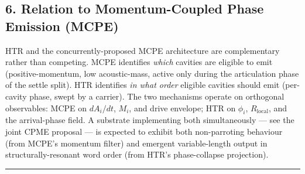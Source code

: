 \documentclass[
  11pt,
  a4paper,
]{article}
\begin{document}
\subsection{6. Relation to Momentum-Coupled Phase Emission
(MCPE)}\label{relation-to-momentum-coupled-phase-emission-mcpe}

HTR and the concurrently-proposed MCPE architecture are complementary
rather than competing. MCPE identifies \emph{which} cavities are
eligible to emit (positive-momentum, low acoustic-mass, active only
during the articulation phase of the settle split). HTR identifies
\emph{in what order} eligible cavities should emit (per-cavity phase,
swept by a carrier). The two mechanisms operate on orthogonal
observables: MCPE on \(dA_i/dt\), \(M_i\), and drive envelope; HTR on
\(\phi_i\), \(R_{\text{local}}\), and the arrival-phase field. A
substrate implementing both simultaneously --- see the joint CPME
proposal --- is expected to exhibit both non-parroting behaviour (from
MCPE's momentum filter) and emergent variable-length output in
structurally-resonant word order (from HTR's phase-collapse projection).

\begin{center}\rule{0.5\linewidth}{0.5pt}\end{center}
\end{document}
